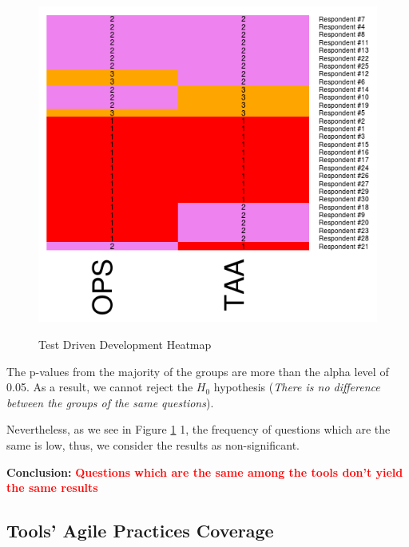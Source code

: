 \begin{figure}[H]
\centering\includegraphics[width=0.5\linewidth]{../include/appendix/heatmaps/TestDrivenDevelopment}
\label{fig:tdd_heatmap}
\caption{Test Driven Development Heatmap}
\end{figure}

\clearpage

The p-values from the majority of the groups are more than the alpha level of 0.05. As a result, we cannot reject the $H_0$ hypothesis ({\scriptsize \textit{There is no difference between the groups of the same questions}}).

Nevertheless, as we see in Figure \ref{fig:tdd_heatmap} 1, the frequency of questions which are the same is low, thus, we consider the results as non-significant.

\textbf{Conclusion:} \textcolor{red}{\textbf{Questions which are the same among the tools don't yield the same results}}

\clearpage

\subsection*{Tools' Agile Practices Coverage}

